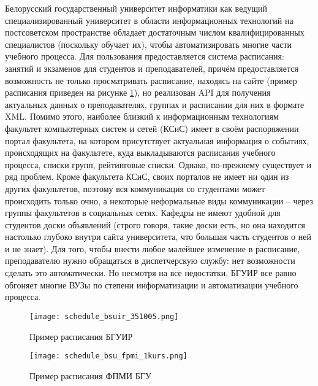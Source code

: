 Белорусский государственный университет информатики
как ведущий специализированный университет в области информационных технологий на постсоветском пространстве обладает достаточным числом квалифицированных специалистов (поскольку обучает их), чтобы автоматизировать многие части учебного процесса. Для пользования предоставляется система расписания: занятий и экзаменов для студентов и преподавателей, причём предоставляется возможность не только просматривать расписание, находясь на сайте (пример расписания приведен на рисунке \ref{fig:analysis:analogues:bsuir}), но реализован API для получения актуальных данных о преподавателях, группах и расписании для них в формате XML. Помимо этого, наиболее близкий к информационным технологиям факультет компьютерных систем и сетей (КСиС) имеет в своём распоряжении портал факультета, на котором присутствует актуальная информация о событиях, происходящих на факультете, куда выкладываются расписания учебного процесса, списки групп, рейтинговые списки. Однако, по-прежнему существует и ряд проблем. Кроме факультета КСиС, своих порталов не имеет ни один из других факультетов, поэтому вся коммуникация со студентами может происходить только очно, а некоторые неформальные виды коммуникации -- через группы факультетов в социальных сетях. Кафедры не имеют удобной для студентов доски объявлений (строго говоря, такие доски есть, но она находится настолько глубоко внутри сайта университета, что большая часть студентов о ней и не знает). Для того, чтобы внести любое малейшее изменение в расписание, преподавателю нужно обращаться в диспетчерскую службу: нет возможности сделать это автоматически. Но несмотря на все недостатки, БГУИР все равно обгоняет многие ВУЗы по степени информатизации и автоматизации учебного процесса.

\begin{figure}
	\centering
	\texttt{[image: schedule\_bsuir\_351005.png]} 
	\caption{Пример расписания БГУИР}
	\label{fig:analysis:analogues:bsuir}
\end{figure}

\begin{figure}
	\centering
	\texttt{[image: schedule\_bsu\_fpmi\_1kurs.png]}
	\caption{Пример расписания ФПМИ БГУ}
	\label{fig:analysis:analogues:bsu_fpmi}
\end{figure}

